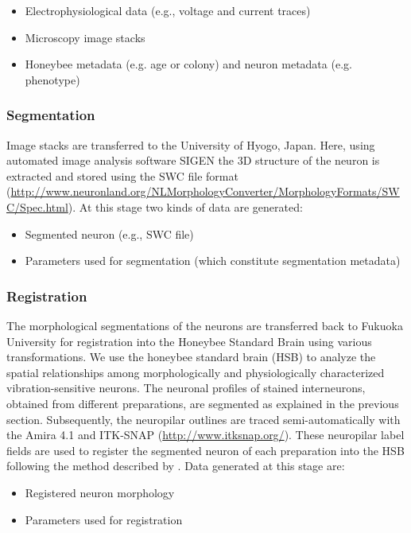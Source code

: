\documentclass{frontiersSCNS} %
\begin{document}
\begin{itemize}
\item Electrophysiological data (e.g., voltage and current traces)
\item Microscopy image stacks
\item Honeybee metadata (e.g. age or colony) and neuron metadata (e.g.
    phenotype)
\end{itemize}

\subsubsection{Segmentation}

Image stacks are transferred to the University of Hyogo, Japan. Here, using
automated image analysis software SIGEN \citep{Yamasaki2006, Minemoto} the 3D
structure of the neuron is extracted and stored using the SWC file format
(\url{http://www.neuronland.org/NLMorphologyConverter/MorphologyFormats/SWC/Spec.html}).
At this stage two kinds of data are generated:

\begin{itemize}
    \item Segmented neuron (e.g., SWC file)
\item Parameters used for segmentation (which constitute segmentation metadata)
\end{itemize}


\subsubsection{Registration}

The morphological segmentations of the neurons are transferred back to Fukuoka
University for registration into the Honeybee Standard Brain using various
transformations. We use the honeybee standard brain (HSB) to analyze the
spatial relationships among morphologically and physiologically characterized
vibration-sensitive neurons. The neuronal profiles of stained interneurons,
obtained from different preparations, are segmented as explained in the previous
section. Subsequently, the neuropilar outlines are traced semi-automatically
with the Amira 4.1 \citep{Evers2005} and ITK-SNAP (\url{http://www.itksnap.org/}).
These neuropilar label
fields are used to register the segmented neuron of each preparation into the
HSB following the method described by \citet{Brandt2005}. Data generated at
this stage are:

\begin{itemize}
\item Registered neuron morphology
\item Parameters used for registration
\end{itemize}
\end{document}
